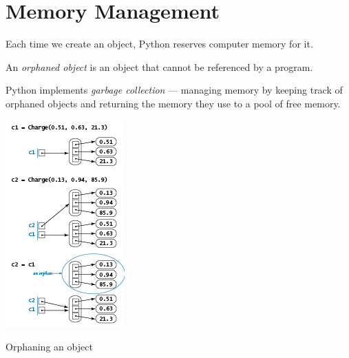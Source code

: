 \documentclass[8pt,a4paper,compress,handout]{beamer}
\begin{document}
\section{Memory Management}
\begin{frame}[fragile]
\begin{minipage}{200pt}
Each time we create an object, Python reserves computer memory for it.

\bigskip

An \emph{orphaned object} is an object that cannot be referenced by a program.

\bigskip

Python implements \emph{garbage collection} --- managing memory by keeping track of orphaned objects and returning the memory they use to a pool of free memory.
\end{minipage}%
\begin{minipage}{100pt}
\begin{center}
\includegraphics[scale=0.45]{figures/orphaning.png}

\smallskip

\tiny Orphaning an object
\end{center}
\end{minipage}
\end{frame}
\end{document}
